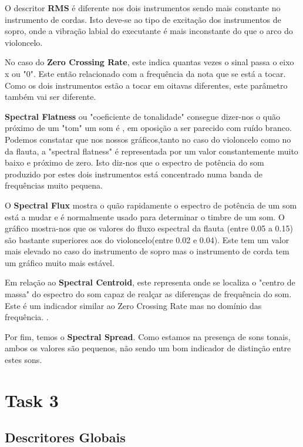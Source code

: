 O descritor \textbf{RMS} é diferente nos dois instrumentos sendo mais constante no instrumento de cordas.
Isto deve-se ao tipo de excitação dos instrumentos de sopro, onde a vibração labial do executante é mais inconstante do que o arco do violoncelo.

No caso do \textbf{Zero Crossing Rate}, este indica quantas vezes o sinal passa o eixo x ou "0".
Este então relacionado com a frequência da nota que se está a tocar.
Como os dois instrumentos estão a tocar em oitavas diferentes, este parâmetro também vai ser diferente. \cite{zcr}

\textbf{Spectral Flatness} ou "coeficiente de tonalidade" consegue dizer-nos o quão próximo de um "tom" um som é , em oposição a ser parecido 
com ruído branco. Podemos constatar que nos nossos gráficos,tanto no caso do violoncelo como no da flauta, a "spectral flatness" é representada por um valor constantemente muito baixo e próximo de zero.
Isto diz-nos que o espectro de potência do som produzido por estes dois instrumentos está concentrado numa banda de frequências muito pequena. \cite{spec_features}

O \textbf{Spectral Flux} mostra o quão rapidamente o espectro de potência de um som está a mudar e é normalmente usado para determinar o timbre de um som.
O gráfico mostra-nos que os valores do fluxo espectral da flauta (entre 0.05 a 0.15) são bastante superiores aos do violoncelo(entre 0.02 e 0.04).
Este tem um valor mais elevado no caso do instrumento de sopro mas o instrumento de corda tem um gráfico muito mais estável. \cite{spec_features}

Em relação ao \textbf{Spectral Centroid}, este representa onde se localiza o "centro de massa" do espectro do som capaz de realçar as diferenças de frequência do som.
Este é um indicador similar ao Zero Crossing Rate mas no domínio das frequência. \cite{spec_features}.

Por fim, temos o \textbf{Spectral Spread}. Como estamos na presença de sons tonais, ambos os valores são pequenos, não sendo um bom indicador de distinção entre estes sons. \cite{spec_features}

\section{Task 3} \label{ex_3}

\subsection{Descritores Globais}

